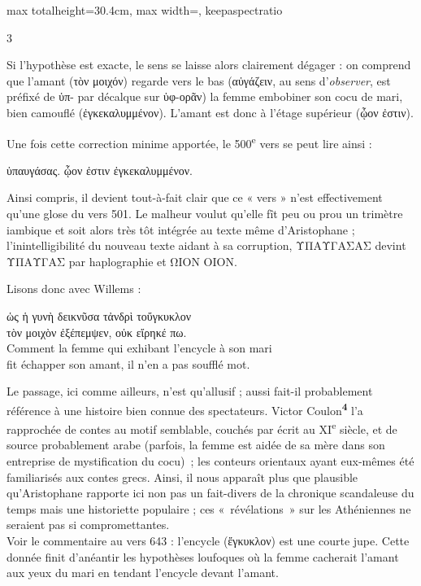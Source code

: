\documentclass[11pt,twoside]{book}
\newcommand{\italique}[1]{\textit{#1}}
\newcommand{\citComm}[1]{\begin{quoting}[vskip=0.4pt,leftmargin=0.7em,rightmargin=0.2em]#1\end{quoting}}
\newcommand{\nieme}[1]{#1\textsuperscript{e}}
\newcommand{\francais}[1]{{\policeFr #1}}
\newcommand{\marqueur}[1]{\textsuperscript{\color{rubricRed}\textbf{#1}}}
\begin{document}
\begin{adjustbox}{max totalheight=30.4cm, max width=\textwidth, keepaspectratio}
\begin{minipage}{\textwidth}
{\begin{multicols}{3}
\par\vspace{1.5pt}
\noindent Si l'hypothèse est exacte, le sens se laisse alors clairement dégager : on comprend que l'amant (τὸν μοιχόν) regarde vers le bas (αὐγάζειν, au sens d'\italique{observer}, est préfixé de ὑπ- par décalque sur ὑφ-ορᾶν) la femme embobiner son cocu de mari, bien camouflé (ἐγκεκαλυμμένον). L'amant est donc à l'étage supérieur (ᾦον ἐστιν).
\par\vspace{1.5pt}
\noindent Une fois cette correction minime apportée, le \nieme{500} vers se peut lire ainsi :
\citComm{[τὸν μοιχόν·] ὑπαυγάσας. ᾦον ἐστιν ἐγκεκαλυμμένον.}
\par\vspace{1.5pt}
\noindent Ainsi compris, il devient tout-à-fait clair que ce « vers » n'est effectivement qu'une glose du vers 501. Le malheur voulut qu'elle fît peu ou prou un trimètre iambique et soit alors très tôt intégrée au texte même d'Aristophane ; l'inintelligibilité du nouveau texte aidant à sa corruption, ΥΠΑΥΓΑΣΑΣ devint ΥΠΑΥΓΑΣ par haplographie et ΩΙΟΝ ΟΙΟΝ.
\par\vspace{1.5pt}
\noindent Lisons donc avec Willems :
\citComm{ὡς ἡ γυνὴ δεικνῦσα τἀνδρὶ τοὔγκυκλον\\
τὸν μοιχὸν ἐξέπεμψεν, οὐκ εἴρηκέ πω.\\
\francais{Comment la femme qui exhibant l'encycle à son mari\\
fit échapper son amant, il n'en a pas soufflé mot.}}
\par\vspace{1.5pt}
\noindent Le passage, ici comme ailleurs, n'est qu'allusif ; aussi fait-il probablement référence à une histoire bien connue des spectateurs. Victor Coulon\marqueur{4} l'a rapprochée de contes au motif semblable, couchés par écrit au \nieme{XI} siècle, et de source probablement arabe (parfois, la femme est aidée de sa mère dans son entreprise de mystification du cocu)~; les conteurs orientaux ayant eux-mêmes été familiarisés aux contes grecs. Ainsi, il nous apparaît plus que plausible qu'Aristophane rapporte ici non pas un fait-divers de la chronique scandaleuse du temps mais une historiette populaire ; ces «~révélations~» sur les Athéniennes ne seraient pas si compromettantes.\\ Voir le commentaire au vers 643 : l'encycle (ἔγκυκλον) est une courte jupe. Cette donnée finit d'anéantir les hypothèses loufoques  où la femme cacherait l'amant aux yeux du mari en tendant l'encycle devant l'amant.

\end{multicols}}
\end{minipage}
\end{adjustbox}
\end{document}
